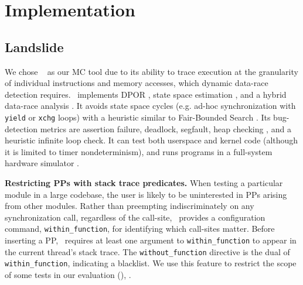 \section{Implementation}
\label{sec:implementation}

\subsection{Landslide}
\label{sec:landslide}

We chose \landslide~\cite{landslide} as our MC tool due to its ability to trace execution at the granularity of individual instructions and memory accesses, which dynamic data-race detection requires.
\landslide~implements DPOR \cite{dpor},
state space estimation \cite{estimation}, and a hybrid
data-race analysis \cite{hybriddatarace}.
It avoids state space cycles (e.g. ad-hoc synchronization with {\tt yield} or {\tt xchg} loops) with a heuristic similar to Fair-Bounded Search \cite{bpor}.
Its bug-detection metrics are assertion failure, deadlock, segfault, heap checking \cite{valgrind}, and a heuristic infinite loop check.
It can test both userspace and kernel code (although it is limited to timer nondeterminism),
and runs programs in a full-system hardware simulator \cite{simics}.

{\bf Restricting PPs with stack trace predicates.}
When testing a particular module in a large codebase,
the user is likely to be uninterested in PPs arising from other modules.
Rather than preempting indiscriminately on any synchronization call, regardless of the call-site,
\landslide~provides a configuration command, {\tt within\_function}, for identifying which call-sites matter.
Before inserting a PP, \landslide~requires at least one argument to {\tt within\_function} to appear in the current thread's stack trace.
The {\tt without\_\allowbreak{}function} directive is the dual of {\tt within\_function}, indicating a blacklist.
We use this feature to restrict the scope of some tests in our evaluation (\sect{\ref{sec:testsuite}}),
.

